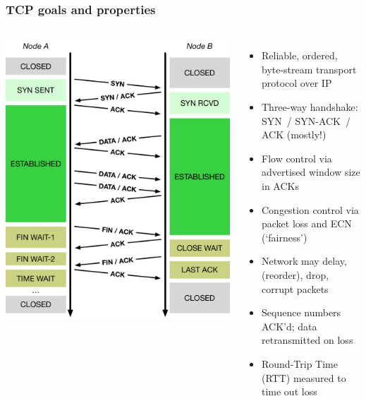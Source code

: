 \begin{frame}
  \frametitle{TCP goals and properties}

  \begin{columns}[T]
      \smallskip
      \begin{center}
	\includegraphics[width=1.15\textwidth]{../../figures/tcp-timeline.pdf}
      \end{center}

      \begin{itemize}
	\item Reliable, ordered, byte-stream transport protocol over IP
	\item Three-way handshake: SYN~/ SYN-ACK~/ ACK (mostly!)
        \item Flow control via advertised window size in ACKs
	\item Congestion control via packet loss and ECN (`fairness')

	\pause

	\item Network may delay, (reorder), drop, corrupt packets
	\item Sequence numbers ACK'd; data retransmitted on loss
	\item Round-Trip Time (RTT) measured to time out loss


      \end{itemize}

  \end{columns}
\end{frame}

